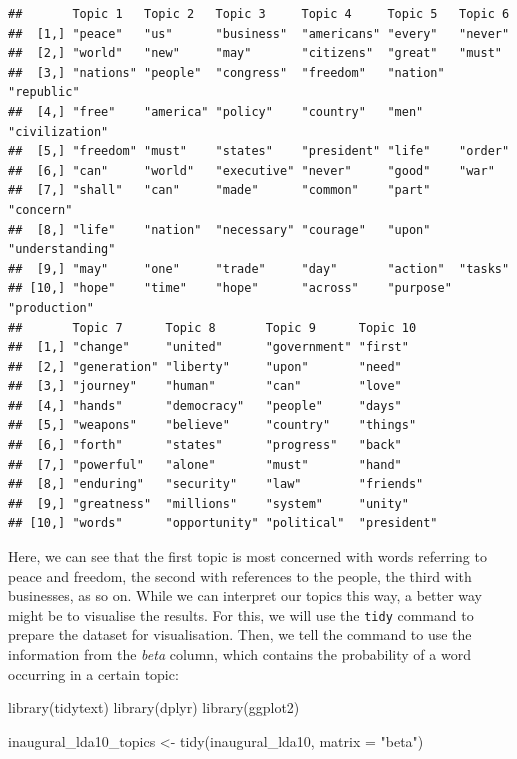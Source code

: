 \documentclass[
]{article}
\newenvironment{Shaded}{\begin{snugshade}}{\end{snugshade}}
\newcommand{\AttributeTok}[1]{\textcolor[rgb]{0.77,0.63,0.00}{#1}}
\newcommand{\FunctionTok}[1]{\textcolor[rgb]{0.00,0.00,0.00}{#1}}
\newcommand{\NormalTok}[1]{#1}
\newcommand{\OtherTok}[1]{\textcolor[rgb]{0.56,0.35,0.01}{#1}}
\newcommand{\StringTok}[1]{\textcolor[rgb]{0.31,0.60,0.02}{#1}}
\begin{document}
\begin{verbatim}
##       Topic 1   Topic 2   Topic 3     Topic 4     Topic 5   Topic 6        
##  [1,] "peace"   "us"      "business"  "americans" "every"   "never"        
##  [2,] "world"   "new"     "may"       "citizens"  "great"   "must"         
##  [3,] "nations" "people"  "congress"  "freedom"   "nation"  "republic"     
##  [4,] "free"    "america" "policy"    "country"   "men"     "civilization" 
##  [5,] "freedom" "must"    "states"    "president" "life"    "order"        
##  [6,] "can"     "world"   "executive" "never"     "good"    "war"          
##  [7,] "shall"   "can"     "made"      "common"    "part"    "concern"      
##  [8,] "life"    "nation"  "necessary" "courage"   "upon"    "understanding"
##  [9,] "may"     "one"     "trade"     "day"       "action"  "tasks"        
## [10,] "hope"    "time"    "hope"      "across"    "purpose" "production"   
##       Topic 7      Topic 8       Topic 9      Topic 10   
##  [1,] "change"     "united"      "government" "first"    
##  [2,] "generation" "liberty"     "upon"       "need"     
##  [3,] "journey"    "human"       "can"        "love"     
##  [4,] "hands"      "democracy"   "people"     "days"     
##  [5,] "weapons"    "believe"     "country"    "things"   
##  [6,] "forth"      "states"      "progress"   "back"     
##  [7,] "powerful"   "alone"       "must"       "hand"     
##  [8,] "enduring"   "security"    "law"        "friends"  
##  [9,] "greatness"  "millions"    "system"     "unity"    
## [10,] "words"      "opportunity" "political"  "president"
\end{verbatim}

Here, we can see that the first topic is most concerned with words referring to peace and freedom, the second with references to the people, the third with businesses, as so on. While we can interpret our topics this way, a better way might be to visualise the results. For this, we will use the \texttt{tidy} command to prepare the dataset for visualisation. Then, we tell the command to use the information from the \emph{beta} column, which contains the probability of a word occurring in a certain topic:

\begin{Shaded}
\begin{Highlighting}[]
\FunctionTok{library}\NormalTok{(tidytext)}
\FunctionTok{library}\NormalTok{(dplyr)}
\FunctionTok{library}\NormalTok{(ggplot2)}

\NormalTok{inaugural\_lda10\_topics }\OtherTok{\textless{}{-}} \FunctionTok{tidy}\NormalTok{(inaugural\_lda10, }\AttributeTok{matrix =} \StringTok{"beta"}\NormalTok{)}
\end{Highlighting}
\end{Shaded}
\end{document}
